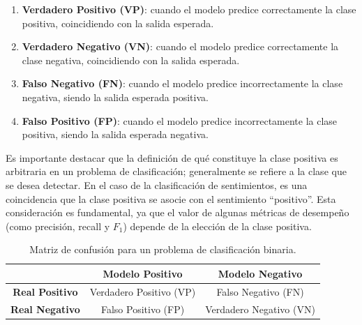 \documentclass[11pt,fleqn]{book} %
\begin{document}
\begin{enumerate}
\item \textbf{Verdadero Positivo (VP)}: cuando el modelo predice correctamente la clase positiva, coincidiendo con la salida esperada.
\item \textbf{Verdadero Negativo (VN)}: cuando el modelo predice correctamente la clase negativa, coincidiendo con la salida esperada.
\item \textbf{Falso Negativo (FN)}: cuando el modelo predice incorrectamente la clase negativa, siendo la salida esperada positiva.
\item \textbf{Falso Positivo (FP)}: cuando el modelo predice incorrectamente la clase positiva, siendo la salida esperada negativa.
\end{enumerate}

Es importante destacar que la definición de qué constituye la clase positiva es arbitraria en un problema de clasificación; generalmente se refiere a la clase que se desea detectar. En el caso de la clasificación de sentimientos, es una coincidencia que la clase positiva se asocie con el sentimiento ``positivo''. Esta consideración es fundamental, ya que el valor de algunas métricas de desempeño (como precisión, recall y $F_1$) depende de la elección de la clase positiva.

\begin{table}[htbp]
\centering
\begin{tabular}{|c|c|c|}
\hline
\textbf{} & \textbf{Modelo Positivo} & \textbf{Modelo Negativo} \\
\hline
\textbf{Real Positivo} & Verdadero Positivo (VP) & Falso Negativo (FN) \\
\hline
\textbf{Real Negativo} & Falso Positivo (FP) & Verdadero Negativo (VN) \\
\hline
\end{tabular}
\caption{Matriz de confusión para un problema de clasificación binaria.}
\label{tab:matriz_confusion}
\end{table}
\end{document}
